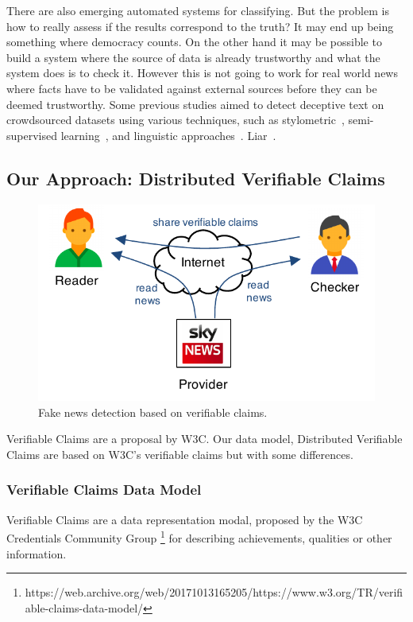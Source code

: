 \documentclass[letterpaper,twocolumn,10pt]{article}
\newcommand{\mypara}[1]{\vspace{5pt}\noindent{\bf {#1}}}
\begin{document}
\mypara{Automatic detection.} There are also emerging automated systems for classifying. But the problem is how to really assess if the results correspond to the truth? It may end up being something where democracy counts. On the other hand it may be possible to build a system where the source of data is already trustworthy and what the system does is to check it. However this is not going to work for real world news where facts have to be validated against external sources before they can be deemed trustworthy. Some previous studies aimed to detect deceptive text on crowdsourced datasets using various techniques, such as stylometric~\cite{stylometric}, semi-supervised learning~\cite{semisupervised}, and linguistic approaches~\cite{linguistic}. Liar~\cite{liar}.


\subsection{Our Approach: Distributed Verifiable Claims}


\begin{figure}[t]
  \centering
  \includegraphics[width=0.9\columnwidth]{figures/model.pdf}
  \vspace{-10pt}
  \caption{Fake news detection based on verifiable claims.}
  \label{fig:model}
\end{figure}

Verifiable Claims are a proposal by W3C. Our data model, Distributed Verifiable Claims are based on W3C's verifiable claims but with some differences.

\subsubsection{Verifiable Claims Data Model}
Verifiable Claims are a data representation modal, proposed by the W3C Credentials Community Group \footnote{https://web.archive.org/web/20171013165205/https://www.w3.org/TR/verifiable-claims-data-model/} for describing achievements, qualities or other information.
\end{document}
